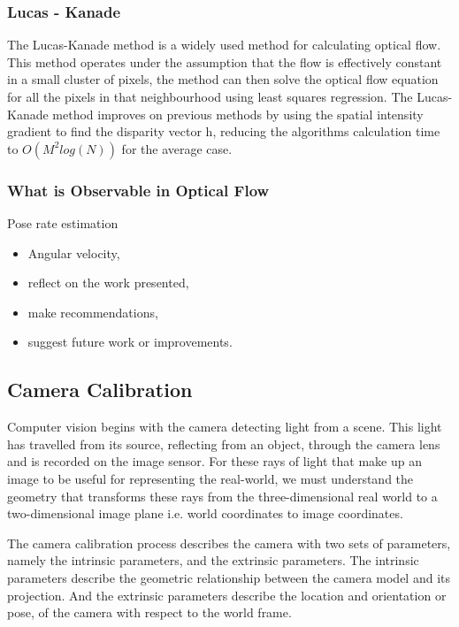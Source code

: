 \documentclass{UoNMCHA}
\numberwithin{equation}{section}
\begin{document}
\subsubsection{Lucas - Kanade} %
The Lucas-Kanade method is a widely used method for calculating optical flow. This method operates under the assumption that the flow is effectively constant in a small cluster of pixels, the method can then solve the optical flow equation for all the pixels in that neighbourhood using least squares regression. The Lucas-Kanade method improves on previous methods by using the spatial intensity gradient to find the disparity vector h, reducing the algorithms calculation time to $O(M^2log(N))$ for the average case.

\subsubsection{What is Observable in Optical Flow}
Pose rate estimation

\begin{itemize}
	\item Angular velocity,
	\item reflect on the work presented, 
	\item make recommendations,
	\item suggest future work or improvements.
\end{itemize}

\newpage
\subsection{Camera Calibration} %
Computer vision begins with the camera detecting light from a scene. This light has travelled from its source, reflecting from an object, through the camera lens and is recorded on the image sensor. For these rays of light that make up an image to be useful for representing the real-world, we must understand the geometry that transforms these rays from the three-dimensional real world to a two-dimensional image plane i.e. world coordinates to image coordinates.

The camera calibration process describes the camera with two sets of parameters, namely the intrinsic parameters, and the extrinsic parameters. The intrinsic parameters describe the geometric relationship between the camera model and its projection. And the extrinsic parameters describe the location and orientation or pose, of the camera with respect to the world frame.
\end{document}
